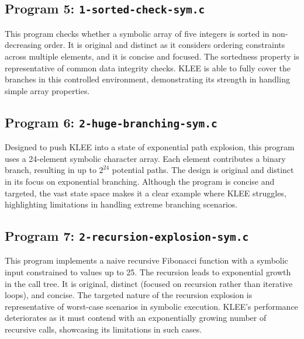 \documentclass[conference]{IEEEtran}
\begin{document}
\subsection{Program 5: \texttt{1-sorted-check-sym.c}}
This program checks whether a symbolic array of five integers is sorted in non-decreasing order. It is original and distinct as it considers ordering constraints across multiple elements, and it is concise and focused. The sortedness property is representative of common data integrity checks. KLEE is able to fully cover the branches in this controlled environment, demonstrating its strength in handling simple array properties.

\subsection{Program 6: \texttt{2-huge-branching-sym.c}}
Designed to push KLEE into a state of exponential path explosion, this program uses a 24-element symbolic character array. Each element contributes a binary branch, resulting in up to $2^{24}$ potential paths. The design is original and distinct in its focus on exponential branching. Although the program is concise and targeted, the vast state space makes it a clear example where KLEE struggles, highlighting limitations in handling extreme branching scenarios.

\subsection{Program 7: \texttt{2-recursion-explosion-sym.c}}
This program implements a naive recursive Fibonacci function with a symbolic input constrained to values up to 25. The recursion leads to exponential growth in the call tree. It is original, distinct (focused on recursion rather than iterative loops), and concise. The targeted nature of the recursion explosion is representative of worst-case scenarios in symbolic execution. KLEE’s performance deteriorates as it must contend with an exponentially growing number of recursive calls, showcasing its limitations in such cases.
\end{document}
